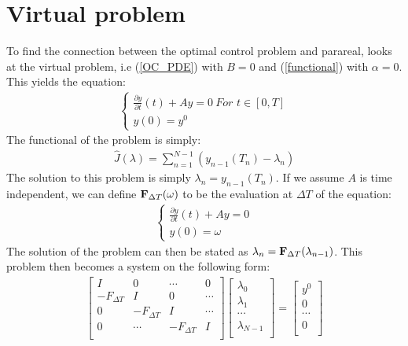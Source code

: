 \documentclass[11pt,a4paper]{article}
\begin{document}
\section{Virtual problem}
To find the connection between the optimal control problem and parareal, \cite{maday2002parareal} looks at the virtual problem, i.e (\ref{OC_PDE}) with $B=0$ and (\ref{functional}) with $\alpha=0$. This yields the equation:
\begin{align}
\left\{
     \begin{array}{lr}
		\frac{\partial y}{\partial t}(t)+Ay=0  \ \textit{For $t \in [0,T]$}\\
		y(0)=y^0
	\end{array}
\right. \label{viritual}
\end{align}
The functional of the problem is simply:
\begin{align}
\hat{J}(\lambda) = \sum_{n=1}^{N-1} (y_{n-1}(T_{n})-\lambda_{n})
\end{align}
The solution to this problem is simply $\lambda_n=y_{n-1}(T_n)$. If we assume $A$ is time independent, we can define $\bold{F}_{\Delta T}(\omega)$ to be the evaluation at $\Delta T$ of the equation:
\begin{align}
\left\{
     \begin{array}{lr}
		\frac{\partial y}{\partial t}(t)+Ay=0  \\
		y(0)=\omega
	\end{array}
\right. 
\end{align}
The solution of the problem can then be stated as $\lambda_n = \bold{F}_{\Delta T}(\lambda_{n-1})$. This problem then becomes a system on the following form:
\begin{align}
  \left[ \begin{array}{cccc}
   I & 0 & \cdots & 0 \\  
   -F_{\Delta T} & I & 0 & \cdots \\ 
   0 &-F_{\Delta T} & I  & \cdots \\
   0 &\cdots &-F_{\Delta T} & I   \\
   \end{array}  \right] 
   \left[ \begin{array}{c}
   \lambda_0 \\
   \lambda_1 \\
   \cdots \\
   \lambda_{N-1} \\
   \end{array}  \right] =
   \left[ \begin{array}{c}
   y^0 \\
   0 \\
   \cdots \\
   0 \\
   \end{array}  \right]
\end{align}
\end{document}
